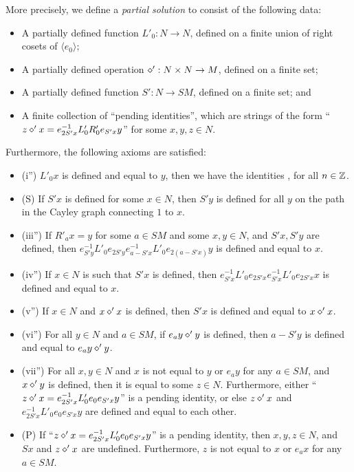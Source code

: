 More precisely, we define a \emph{partial solution} to consist of the following data:
\begin{itemize}
  \item A partially defined function $L'_0: N \to N$, defined on a finite union of right cosets of $\langle e_0\rangle$;
  \item A partially defined operation $\diamond': N \times N \to M$, defined on a finite set;
  \item A partially defined function $S': N \to SM$, defined on a finite set; and
  \item A finite collection of ``pending identities'', which are strings of the form ``$z \diamond' x = e_{2S'x}^{-1} L'_0 R'_0 e_{S'x} y$'' for some $x,y,z \in N$.
\end{itemize}

Furthermore, the following axioms are satisfied:
\begin{itemize}
  \item (i'')  $L'_0 x$ is defined and equal to $y$, then we have the identities ,  for all $n\in \mathbb{Z}$.
  \item (S) If $S'x$ is defined for some $x \in N$, then $S'y$ is defined for all $y$ on the path in the Cayley graph connecting $1$ to $x$.
  \item (iii'') If $R'_a x = y$ for some $a \in SM$ and some $x,y \in N$, and $S'x, S'y$ are defined, then $e_{S'y}^{-1} L'_0 e_{2S'y} e_{a-S'x}^{-1} L'_0 e_{2(a-S'x)} y$ is defined and equal to $x$.
  \item (iv'') If $x \in N$ is such that $S'x$ is defined, then $e_{S'x}^{-1} L'_0 e_{2S'x} e_{S'x}^{-1} L'_0 e_{2S'x} x$ is defined and equal to $x$.
  \item (v'')  If $x \in N$ and $x \diamond' x$ is defined, then $S'x$ is defined and equal to $x \diamond' x$.
  \item (vi'')  For all $y \in N$ and $a \in SM$, if $e_a y \diamond' y$ is defined, then $a - S'y$ is defined and equal to $e_a y \diamond' y$.
  \item (vii'')  For all $x,y \in N$ and $x$ is not equal to $y$ or $e_a y$ for any $a \in SM$, and $x \diamond' y$ is defined, then it is equal to some $z \in N$.  Furthermore, either ``$z \diamond' x = e_{2S'x}^{-1} L'_0 e_0 e_{S'x} y$'' is a pending identity, or else $z \diamond' x$ and $e_{2S'x}^{-1} L'_0 e_0 e_{S'x} y$ are defined and equal to each other.
  \item (P) If ``$z \diamond' x = e_{2S'x}^{-1} L'_0 e_0 e_{S'x} y$'' is a pending identity, then $x,y,z \in N$, and $Sx$ and $z \diamond' x$ are undefined.  Furthermore, $z$ is not equal to $x$ or $e_a x$ for any $a \in SM$.
\end{itemize}

